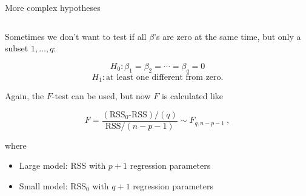 \documentclass[10pt,ignorenonframetext,]{beamer}
\providecommand{\tightlist}{%
  \setlength{\itemsep}{0pt}\setlength{\parskip}{0pt}}
\begin{document}
\begin{frame}

\begin{block}{More complex hypotheses}

\(~\)

Sometimes we don't want to test if all \(\beta\)'s are zero at the same
time, but only a subset \(1,\ldots , q\):

\[ H_0: \beta_1=\beta_2=\cdots= \beta_q =0\] 
\[H_1: \text{at least one different from zero}.\]

\vspace{2mm}

Again, the \(F\)-test can be used, but now \(F\) is calculated like

\[F=\frac{(\text{RSS$_0$-RSS})/(q)}{\text{RSS}/(n-p-1)} \sim F_{q,n-p-1} \ ,\]

where

\begin{itemize}
\tightlist
\item
  Large model: RSS with \(p+1\) regression parameters
\item
  Small model: RSS\(_0\) with \(q+1\) regression parameters
\end{itemize}

\end{block}

\end{frame}
\end{document}
